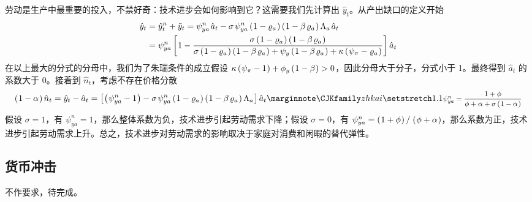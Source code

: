 劳动是生产中最重要的投入，不禁好奇：技术进步会如何影响到它？这需要我们先计算出 \(\hat y_t\)。从产出缺口的定义开始
\begin{align*}
    \hat y_t &= \hat y_t^n+\tilde y_t=\psi^n_{ya}\,\hat a_t-\sigma\,\psi^n_{ya}\bka{1-\varrho_a}\bka{1-\beta\,\varrho_a}\Lambda_a\,\hat a_t\\
    &=\psi^n_{ya}\bks{1-\dfrac{\sigma\bka{1-\varrho_a}\bka{1-\beta\,\varrho_a}}{\sigma\bka{1-\varrho_a}\bka{1-\beta\,\varrho_a}+\psi_y\bka{1-\beta\,\varrho_a}+\kappa\bka{\psi_\pi-\varrho_a}}}\hat a_t
\end{align*}
在以上最大的分式的分母中，我们为了朱瑞条件的成立假设 \(\kappa\left(\mspace{1mu}\psi_\pi-1\mspace{1mu}\right)+\phi_y\left(\mspace{1mu}1-\beta\mspace{1mu}\right)>0\)，因此分母大于分子，分式小于 1。最终得到 \(\hat a_t\) 的系数大于 0。接着到 \(\hat n_t\)，考虑不存在价格分散
\begin{align*}
    \bka{1-\alpha}\hat n_t=\hat y_t-\hat a_t=\bks{\bka{\psi^n_{ya}-1}-\sigma\,\psi^n_{ya}\bka{1-\varrho_a}\bka{1-\beta\,\varrho_a}\Lambda_a}\hat a_t\sidenote{\sidemath{\(\psi_{ya}^n=\dfrac{1+\phi}{\phi+\alpha+\sigma\bka{1-\alpha}}\)}}
\end{align*}
假设 \(\sigma=1\)，有 \(\psi^n_{ya}=1\)，那么整体系数为负，技术进步引起劳动需求下降；假设 \(\sigma=0\)，有 \(\psi^n_{ya}=\bka{1+\phi}/\,\bka{\phi+\alpha}\)，那么系数为正，技术进步引起劳动需求上升。总之，技术进步对劳动需求的影响取决于家庭对消费和闲暇的替代弹性。

\subsection{货币冲击}

不作要求，待完成。




\SymmetricGeometry
